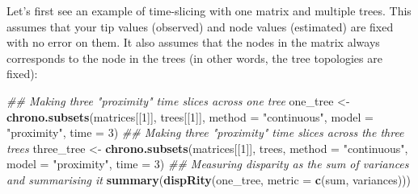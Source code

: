 \documentclass[]{book}
\newenvironment{Shaded}{\begin{snugshade}}{\end{snugshade}}
\newcommand{\CommentTok}[1]{\textcolor[rgb]{0.56,0.35,0.01}{\textit{#1}}}
\newcommand{\ControlFlowTok}[1]{\textcolor[rgb]{0.13,0.29,0.53}{\textbf{#1}}}
\newcommand{\DataTypeTok}[1]{\textcolor[rgb]{0.13,0.29,0.53}{#1}}
\newcommand{\DecValTok}[1]{\textcolor[rgb]{0.00,0.00,0.81}{#1}}
\newcommand{\KeywordTok}[1]{\textcolor[rgb]{0.13,0.29,0.53}{\textbf{#1}}}
\newcommand{\NormalTok}[1]{#1}
\newcommand{\OperatorTok}[1]{\textcolor[rgb]{0.81,0.36,0.00}{\textbf{#1}}}
\newcommand{\OtherTok}[1]{\textcolor[rgb]{0.56,0.35,0.01}{#1}}
\newcommand{\StringTok}[1]{\textcolor[rgb]{0.31,0.60,0.02}{#1}}
\begin{document}
\begin{Shaded}
\end{Shaded}

Let's first see an example of time-slicing with one matrix and multiple trees.
This assumes that your tip values (observed) and node values (estimated) are fixed with no error on them.
It also assumes that the nodes in the matrix always corresponds to the node in the trees (in other words, the tree topologies are fixed):

\begin{Shaded}
\begin{Highlighting}[]
\CommentTok{## Making three "proximity" time slices across one tree}
\NormalTok{one_tree <-}\StringTok{ }\KeywordTok{chrono.subsets}\NormalTok{(matrices[[}\DecValTok{1}\NormalTok{]], trees[[}\DecValTok{1}\NormalTok{]],}
                           \DataTypeTok{method =} \StringTok{"continuous"}\NormalTok{,}
                           \DataTypeTok{model =} \StringTok{"proximity"}\NormalTok{, }\DataTypeTok{time =} \DecValTok{3}\NormalTok{)}
\CommentTok{## Making three "proximity" time slices across the three trees}
\NormalTok{three_tree <-}\StringTok{ }\KeywordTok{chrono.subsets}\NormalTok{(matrices[[}\DecValTok{1}\NormalTok{]], trees,}
                             \DataTypeTok{method =} \StringTok{"continuous"}\NormalTok{,}
                             \DataTypeTok{model =} \StringTok{"proximity"}\NormalTok{, }\DataTypeTok{time =} \DecValTok{3}\NormalTok{)}
\CommentTok{## Measuring disparity as the sum of variances and summarising it}
\KeywordTok{summary}\NormalTok{(}\KeywordTok{dispRity}\NormalTok{(one_tree, }\DataTypeTok{metric =} \KeywordTok{c}\NormalTok{(sum, variances)))}
\end{Highlighting}
\end{Shaded}
\end{document}
